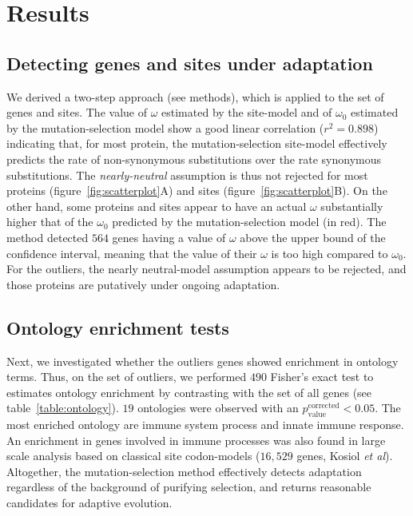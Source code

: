 \documentclass{article}
\begin{document}
\section*{Results}

\subsection*{Detecting genes and sites under adaptation}

We derived a two-step approach (see methods), which is applied to the set of genes and sites.
The value of $\omega$ estimated by the site-model and of $\omega_{0}$ estimated by the mutation-selection model show a good linear correlation ($r^2=0.898$) indicating that, for most protein, the mutation-selection site-model effectively predicts the rate of non-synonymous substitutions over the rate synonymous substitutions.
The \textit{nearly-neutral} assumption is thus not rejected for most proteins (figure~\ref{fig:scatterplot}A) and sites (figure~\ref{fig:scatterplot}B).
On the other hand, some proteins and sites appear to have an actual $\omega$ substantially higher that of the $\omega_0$ predicted by the mutation-selection model (in red).
The method detected $564$ genes having a value of $\omega$ above the upper bound of the confidence interval, meaning that the value of their $\omega$ is too high compared to $\omega_{0}$.
For the outliers, the nearly neutral-model assumption appears to be rejected, and those proteins are putatively under ongoing adaptation.

\subsection*{Ontology enrichment tests}
Next, we investigated whether the outliers genes showed enrichment in ontology terms.
Thus, on the set of outliers, we performed $490$ Fisher's exact test to estimates ontology enrichment by contrasting with the set of all genes (see table~\ref{table:ontology}).
$19$ ontologies were observed with an $p_{\mathrm{value}}^{\mathrm{corrected}} < 0.05$.
The most enriched ontology are immune system process and innate immune response.
An enrichment in genes involved in immune processes was also found in large scale analysis based on classical site codon-models ($16,529$ genes, Kosiol \textit{et al}\cite{kosiol_patterns_2008}).
Altogether, the mutation-selection method effectively detects adaptation regardless of the background of purifying selection, and returns reasonable candidates for adaptive evolution.
\end{document}
